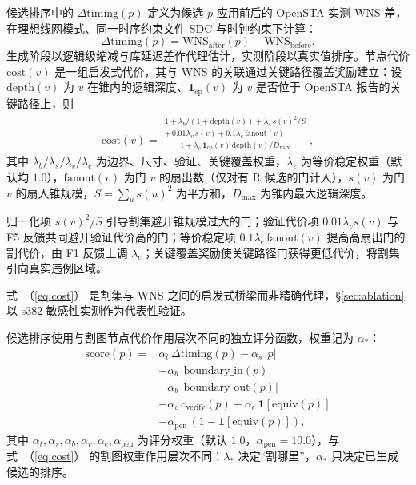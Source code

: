 \documentclass[twocolumn,10pt]{ctexart}
\renewcommand{\eqref}[1]{\textup{（\ref{#1}）}}
\begin{document}
候选排序中的 $\Delta\mathrm{timing}(p)$ 定义为候选 $p$ 应用前后的 OpenSTA 实测 WNS 差，在理想线网模式、同一时序约束文件 SDC 与时钟约束下计算：
\begin{equation}\label{eq:dtiming}
\Delta\mathrm{timing}(p) = \mathrm{WNS}_{\mathrm{after}}(p) - \mathrm{WNS}_{\mathrm{before}}.
\end{equation}
生成阶段以逻辑级缩减与库延迟差作代理估计，实测阶段以真实值排序。节点代价 $\mathrm{cost}(v)$ 是一组启发式代价，其与 WNS 的关联通过关键路径覆盖奖励建立：设 $\mathrm{depth}(v)$ 为 $v$ 在锥内的逻辑深度、$\mathbf{1}_{\mathrm{cp}}(v)$ 为 $v$ 是否位于 OpenSTA 报告的关键路径上，则
{\small
\begin{equation}
\label{eq:cost}
\begin{split}
\mathrm{cost}(v) = \frac{\substack{1 + \lambda_b/(1+\mathrm{depth}(v)) + \lambda_s\,s(v)^2/S \\ +\, 0.01\lambda_v\,s(v) + 0.1\lambda_e\,\mathrm{fanout}(v)}}{1 + \lambda_c\,\mathbf{1}_{\mathrm{cp}}(v)\,\mathrm{depth}(v)/D_{\max}},
\end{split}
\end{equation}
}
其中 $\lambda_b/\lambda_s/\lambda_v/\lambda_c$ 为边界、尺寸、验证、关键覆盖权重，$\lambda_e$ 为等价稳定权重（默认均 $1.0$），$\mathrm{fanout}(v)$ 为门 $v$ 的扇出数（仅对有 R 候选的门计入），$s(v)$ 为门 $v$ 的扇入锥规模，$S=\sum_u s(u)^2$ 为平方和，$D_{\max}$ 为锥内最大逻辑深度。

归一化项 $s(v)^2/S$ 引导割集避开锥规模过大的门；验证代价项 $0.01\lambda_v s(v)$ 与 F5 反馈共同避开验证代价高的门；等价稳定项 $0.1\lambda_e\,\mathrm{fanout}(v)$ 提高高扇出门的割代价，由 F1 反馈上调 $\lambda_e$；关键覆盖奖励使关键路径门获得更低代价，将割集引向真实违例区域。

式~\eqref{eq:cost} 是割集与 WNS 之间的启发式桥梁而非精确代理，\S\ref{sec:ablation} 以 s382 敏感性实测作为代表性验证。

候选排序使用与割图节点代价作用层次不同的独立评分函数，权重记为 $\alpha_*$：
{\small
\begin{equation}\label{eq:score}
\begin{split}
\mathrm{score}(p) = {}&\alpha_t\,\Delta\mathrm{timing}(p) - \alpha_s\,|p| \\
&- \alpha_b\,|\mathrm{boundary\_in}(p)| \\
&- \alpha_b\,|\mathrm{boundary\_out}(p)| \\
&- \alpha_v\,c_{\mathrm{verify}}(p) + \alpha_e\,\mathbf{1}[\mathrm{equiv}(p)] \\
&- \alpha_{\mathrm{pen}}\,(1-\mathbf{1}[\mathrm{equiv}(p)]),
\end{split}
\end{equation}
}
其中 $\alpha_t,\alpha_s,\alpha_b,\alpha_v,\alpha_e,\alpha_{\mathrm{pen}}$ 为评分权重（默认 $1.0$，$\alpha_{\mathrm{pen}}=10.0$），与式~\eqref{eq:cost} 的割图权重作用层次不同：$\lambda_*$ 决定“割哪里”，$\alpha_*$ 只决定已生成候选的排序。
\end{document}
